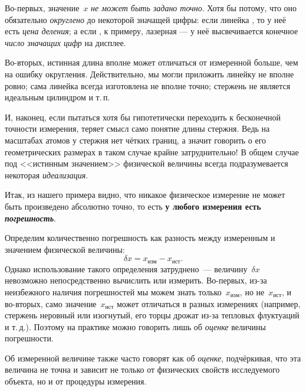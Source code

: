 Во-первых, значение~$x$ \emph{не может быть задано точно}. Хотя бы
потому, что оно обязательно \emph{округлено} до некоторой значащей
цифры: если линейка , то у неё
есть \emph{цена деления}; а если , к примеру, лазерная
--- у неё высвечивается конечное \emph{число значащих цифр}
на дисплее.

Во-вторых, истинная длина вполне может отличаться от измеренной больше,
чем на ошибку округления. Действительно,
мы могли приложить линейку не вполне ровно; сама линейка всегда
изготовлена не вполне точно; стержень не является идеальным цилиндром и т.\,п.

И, наконец, если пытаться хотя бы гипотетически переходить к бесконечной
точности измерения, теряет смысл само понятие  длины стержня. Ведь на масштабах атомов у стержня нет чётких границ, а значит говорить о его
геометрических размерах в таком случае крайне затруднительно! В общем случае 
под <<истинным значением>> физической величины всегда подразумевается 
некоторая \emph{идеализация}.

Итак, из нашего примера видно, что никакое физическое измерение не может быть
произведено абсолютно точно, то есть
\textbf{у любого измерения есть \emph{погрешность}}.%

Определим количественно погрешность как разность между измеренным и  значением физической величины:
\[
    \delta x = x_{\text{изм}} - x_{\text{ист}}.
\]
Однако использование такого определения затруднено~---
величину~$\delta x$ невозможно непосредственно вычислить или измерить. Во-первых, из-за неизбежного наличия погрешностей мы можем знать только~$x_{изм}$,
но не~$x_{ист}$, и во-вторых, само значение~$x_{ист}$ может отличаться в разных измерениях (например, стержень
неровный или изогнутый, его торцы дрожат из-за тепловых флуктуаций и т.\,д.).
Поэтому на практике можно говорить лишь об \emph{оценке} величины погрешности.

Об измеренной величине также часто говорят как об \emph{оценке}, подчёркивая,
что эта величина не точна и зависит не только от физических свойств
исследуемого объекта, но и от процедуры измерения.

